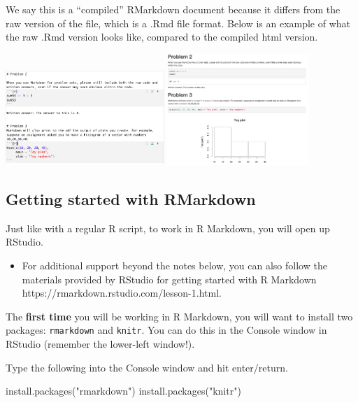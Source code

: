 \documentclass[
  letterpaper,
  DIV=11,
  numbers=noendperiod]{scrreprt}
\newenvironment{Shaded}{\begin{snugshade}}{\end{snugshade}}
\newcommand{\FunctionTok}[1]{\textcolor[rgb]{0.28,0.35,0.67}{#1}}
\newcommand{\NormalTok}[1]{\textcolor[rgb]{0.00,0.23,0.31}{#1}}
\newcommand{\StringTok}[1]{\textcolor[rgb]{0.13,0.47,0.30}{#1}}
\providecommand{\tightlist}{%
  \setlength{\itemsep}{0pt}\setlength{\parskip}{0pt}}\usepackage{longtable,booktabs,array}
\begin{document}
We say this is a ``compiled'' RMarkdown document because it differs from
the raw version of the file, which is a .Rmd file format. Below is an
example of what the raw .Rmd version looks like, compared to the
compiled html version.

\includegraphics[width=0.45\textwidth,height=\textheight]{images/rmarkdownraw.png}
\includegraphics[width=0.4\textwidth,height=\textheight]{images/rmarkdownscreenshot.png}

\hypertarget{getting-started-with-rmarkdown}{%
\subsection{Getting started with
RMarkdown}\label{getting-started-with-rmarkdown}}

Just like with a regular R script, to work in R Markdown, you will open
up RStudio.

\begin{itemize}
\tightlist
\item
  For additional support beyond the notes below, you can also follow the
  materials provided by RStudio for getting started with R Markdown
  https://rmarkdown.rstudio.com/lesson-1.html.
\end{itemize}

The \textbf{first time} you will be working in R Markdown, you will want
to install two packages: \texttt{rmarkdown} and \texttt{knitr}. You can
do this in the Console window in RStudio (remember the lower-left
window!).

Type the following into the Console window and hit enter/return.

\begin{Shaded}
\begin{Highlighting}[]
\FunctionTok{install.packages}\NormalTok{(}\StringTok{"rmarkdown"}\NormalTok{)}
\FunctionTok{install.packages}\NormalTok{(}\StringTok{"knitr"}\NormalTok{)}
\end{Highlighting}
\end{Shaded}
\end{document}
